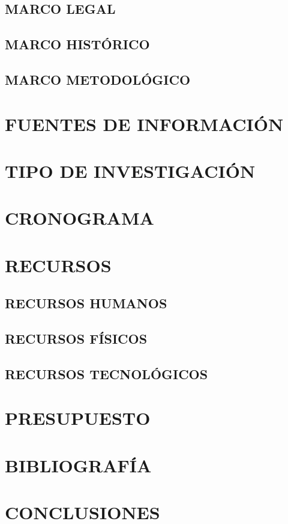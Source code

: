 \documentclass[stu,12pt,floatsintext]{apa7}
\begin{document}
	\subsection{MARCO LEGAL}
	\subsection{MARCO HISTÓRICO}
	\subsection{MARCO METODOLÓGICO}
	
	\section{FUENTES DE INFORMACIÓN}
	
	\section{TIPO DE INVESTIGACIÓN}
	
	\section{CRONOGRAMA}
	
	\section{RECURSOS}
	\subsection{RECURSOS HUMANOS}
	\subsection{RECURSOS FÍSICOS}
	\subsection{RECURSOS TECNOLÓGICOS}
	
	\section{PRESUPUESTO}
	
	\section{BIBLIOGRAFÍA}
	\renewcommand\refname{Referencias}
	
	
	
	

	
	
	\section{CONCLUSIONES}
	
\end{document}
